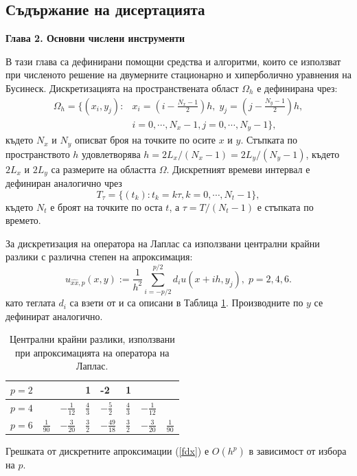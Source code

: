 \documentclass[a5paper]{article}
\newcommand{\be}{\begin{equation}}
\newcommand{\ee}{\end{equation}}
\newcommand{\rf}[1]{(\ref{#1})}
\theoremstyle{remark}
\begin{document}
\begin{normalsize}
\section{Съдържание на дисертацията}
 
\textbf{Глава 2. Основни числени инструменти}

В тази глава са дефинирани помощни средства и алгоритми, които се използват при численото решение на двумерните стационарно и хиперболично уравнения на Бусинеск. Дискретизацията на пространствената област $\Omega_h$ е дефинирана чрез:
\begin{align}\label{Omega}
\Omega_h = \{(x_i,y_j):& x_i = (i-\frac{N_x-1}{2})h, \; y_j = (j-\frac{N_y-1}{2})h, \nonumber\\
                                   & i = 0,\cdots, N_x-1, j = 0 ,\cdots , N_y-1 \},
\end{align}
където $N_x$ и $N_y$ описват броя на точките по осите $x$ и $y$. Стъпката по пространството $h$ удовлетворява $h =2 L_x/(N_x-1) =2 L_y/(N_y-1)$, където $2 L_x$ и $2 L_y$ са размерите на областта $\Omega$. Дискретният времеви интервал е дефиниран аналогично чрез
\be
T_{\tau} = \{(t_k): t_k = k\tau, k = 0,\cdots ,N_t-1 \},
\ee
където $N_t$ е броят на точките по оста $t$, а $\tau = T/(N_t-1)$ е стъпката по времето.

За дискретизация на оператора на Лаплас са използвани централни крайни разлики с различна степен на апроксимация:
\begin{equation}\label{fdx}
u_{\widehat{xx},p}(x,y) :=  \frac{1}{h^2} \sum\limits_{i=-p/2}^{p/2} d_i u(x+ih, y_j), \; p=2,4,6.
\end{equation}
като теглата $d_i$ са взети от \cite{forn} и са описани в Таблица \ref{table:A00}. Производните по $y$ се дефинират аналогично.

\begin{table}[ht]
\centering
\small
		\begin{tabular}{||c|l|l|l|l|l|l|l||}
			\hline
			\hline
            $p=2$          &          &                                 &     1      &   -2   &    1    &    &        \\
   			\hline 
			\hline 
           $p=4$          &                            &   $-\frac{1}{12}$     &     $\frac{4}{3}$      &   $-\frac{5}{2} $     &    $\frac{4}{3}$    &  $-\frac{1}{12}$   &        \\
	   \hline
			\hline 
            $p=6$        &   $\frac{1}{90}$       &     $-\frac{3}{20}$     &    $\frac{3}{2}$      &    $-\frac{49}{18}$   &    $\frac{3}{2}$    & $-\frac{3}{20}$    &    $\frac{1}{90}$       \\
	   \hline
			\hline 
		\end{tabular}
	\caption{Централни крайни разлики, използвани при апроксимацията на оператора на Лаплас.}
	\label{table:A00}
\end{table}
Грешката от дискретните апроксимации \rf{fdx} е $O(h^p)$ в зависимост от избора на $p$.


\end{normalsize}
\end{document}
